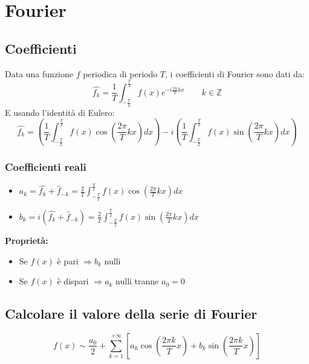 \documentclass[10pt, a4paper]{article}
\begin{document}
\section{Fourier}
    \subsection{Coefficienti}
        Data una funzione $f$ periodica di periodo $T$, i coefficienti di Fourier sono dati da:
        \begin{equation*}
            \hat{f_k}=\frac{1}{T}\int_{-\frac{T}{2}}^{\frac{T}{2}}f(x)e^{-i\frac{2\pi}{T}kx} \qquad k\in\mathbb{Z}
        \end{equation*}
        E usando l'identità di Eulero:
        \begin{equation*}
            \hat{f_k}=\left(\frac{1}{T}\int_{-\frac{T}{2}}^{\frac{T}{2}}f(x)\cos\left(\frac{2\pi}{T}kx\right)dx\right)-i\left(\frac{1}{T}\int_{-\frac{T}{2}}^{\frac{T}{2}}f(x)\sin\left(\frac{2\pi}{T}kx\right)dx\right)
        \end{equation*}
        \subsubsection{Coefficienti reali}
        \begin{itemize}
            \item $a_k=\hat{f_k}+\hat{f}_{-k}=\frac{2}{T}\int_{-\frac{T}{2}}^{\frac{T}{2}}f(x)\cos\left(\frac{2\pi}{T}kx\right)dx$
            \item $b_k=i(\hat{f_k}+\hat{f}_{-k})=\frac{2}{T}\int_{-\frac{T}{2}}^{\frac{T}{2}}f(x)\sin\left(\frac{2\pi}{T}kx\right)dx$
        \end{itemize}
        \textbf{Proprietà:} \begin{itemize}
            \item Se $f(x)$ è pari $\Rightarrow b_k$ nulli
            \item Se $f(x)$ è dispari $\Rightarrow a_k$ nulli tranne $a_0=0$
        \end{itemize}
    \subsection{Calcolare il valore della serie di Fourier}
        \begin{equation*}
            f(x)\sim \frac{a_0}{2}+\sum_{k=1}^{+\infty}\left[a_k\cos\left(\frac{2\pi k}{T}x\right)+b_k\sin\left(\frac{2\pi k}{T}x\right)\right]
        \end{equation*}
\end{document}
